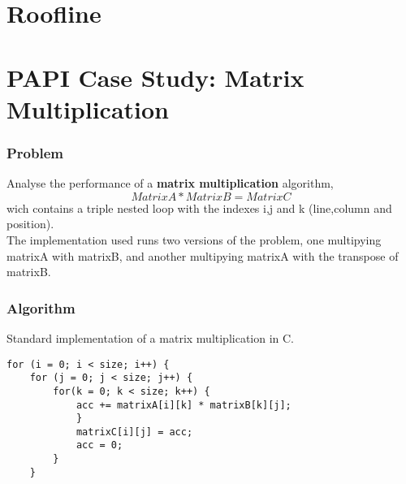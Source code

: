 \documentclass{beamer}
\begin{document}
\section{Roofline}
\begin{frame}
	\begin{figure}[!htp]
		\label{fig:roofline}
		\end{figure}
\end{frame}

\section{PAPI Case Study: Matrix Multiplication}
\begin{frame}%
	\frametitle{Problem}

	Analyse the performance of a \textbf{matrix multiplication} algorithm, \begin{equation}Matrix A * Matrix B = Matrix C\end{equation} wich contains a triple nested loop with the indexes i,j and k (line,column and position).\\

	The implementation used runs two versions of the problem, one multipying matrixA with matrixB, and another multipying matrixA with the transpose of matrixB.
\end{frame}%

\begin{frame}[fragile]
	\frametitle{Algorithm}

Standard implementation of a matrix multiplication in C.

\begin{verbatim}
for (i = 0; i < size; i++) {
    for (j = 0; j < size; j++) {
        for(k = 0; k < size; k++) {
            acc += matrixA[i][k] * matrixB[k][j];				
            }		
            matrixC[i][j] = acc;	
            acc = 0;
        }
    }
\end{verbatim}
\end{frame}
\end{document}
